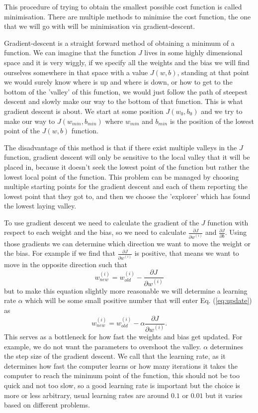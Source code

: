 This procedure of trying to obtain the smallest possible
cost function is called minimisation. There are multiple
methods to minimise the cost function, the one that we will
go with will be minimisation via gradient-descent.

Gradient-descent is a straight forward method of obtaining a
minimum of a function. We can imagine that the function $J$
lives in some highly dimensional space and it is very
wiggly, if we specify all the weights and the bias we will
find ourselves somewhere in that space with a value
$J(w,b)$, standing at that point we would surely know where
is up and where is down, or how to get to the bottom of the
'valley' of this function, we would just follow the path of
steepest descent and slowly make our way to the bottom of
that function.  This is what gradient descent is about. We
start at some position $J(w_0,b_0)$ and we try to make our
way to $J(w_{min}, b_{min})$ where $w_{min}$ and $b_{min}$
is the position of the lowest point of the $J(w,b)$
function.

The disadvantage of this method is that if there exist
multiple valleys in the $J$ function, gradient descent will
only be sensitive to the local valley that it will be placed
in, because it doesn't seek the lowest point of the function
but rather the lowest local point of the function. This
problem can be managed by choosing multiple starting points
for the gradient descent and each of them reporting the
lowest point that they got to, and then we choose the
'explorer' which has found the lowest laying valley.

To use gradient descent we need to calculate the gradient of
the $J$ function with respect to each weight and the bias,
so we need to calculate $\frac{\partial J}{\partial
w^{(i)}}$ and $\frac{\partial J }{\partial b}$. Using those
gradients we can determine which direction we want to move
the weight or the bias.  For example if we find that
$\frac{\partial J}{ \partial w^{(i)}}$ is positive, that
means we want to move in the opposite direction such that
\begin{equation}\label{eq:update} w^{(i)}_{new} =
    w^{(i)}_{old} - \frac{\partial J}{\partial w^{(i)}}
\end{equation} but to make this equation slightly more
reasonable we will determine a learning rate $\alpha$ which
will be some small positive number that will enter Eq.
(\ref{eq:update}) as \begin{equation} w^{(i)}_{new} =
w^{(i)}_{old} - \alpha \frac{\partial J}{\partial w^{(i)}}.
\end{equation} This serves as a bottleneck for how fast the
weights and bias get updated.  For example, we do not want
the parameters to overshoot the valley.  $\alpha$ determines
the step size of the gradient descent. We call that the
learning rate, as it determines how fast the computer learns
or how many iterations it takes the computer to reach the
minimum point of the function, this should not be too quick
and not too slow, so a good learning rate is important but
the choice is more or less arbitrary, usual learning rates
are around $0.1$ or $0.01$ but it varies based on different
problems.

